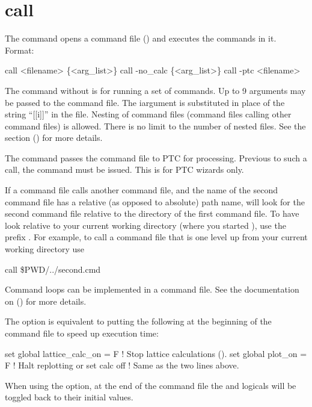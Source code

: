\section{call}
\label{s:call}

The  command opens a command file () and executes the commands in
it. Format: 
\vskip 1pt
\begin{example}
  call <filename> \{<arg_list>\}
  call -no_calc \{<arg_list>\}
  call -ptc <filename>
\end{example}

\vskip 1pt 
The  command without  is for running a set of \tao commands.  Up to 9
arguments may be passed to the command file. The i\Th argument is substituted in place of the string
``[[i]]'' in the file. Nesting of command files (command files calling other command files) is
allowed. There is no limit to the number of nested files.  See the 
section () for more details.

The  command passes the command file to PTC for processing. Previous to such a call,
the command  must be issued. This is for PTC wizards only.

If a command file calls another command file, and the name of the second command file has a relative
(as opposed to absolute) path name, \tao will look for the second command file relative to the
directory of the first command file. To have \tao look relative to your current working directory
(where you started \tao), use the prefix . For example, to call a command file that is
one level up from your current working directory use
\begin{example}
  call \$PWD/../second.cmd
\end{example}

Command loops can be implemented in a command file. See the documentation on 
() for more details.

The  option is equivalent to putting the following at the beginning of the
command file to speed up execution time:
\begin{example}
  set global lattice_calc_on = F   ! Stop lattice calculations ().
  set global plot_on = F           ! Halt replotting 
or
  set calc off                     ! Same as the two lines above.
\end{example}
When using the  option, at the end of the command file the  and
 logicals will be toggled back to their initial values.

